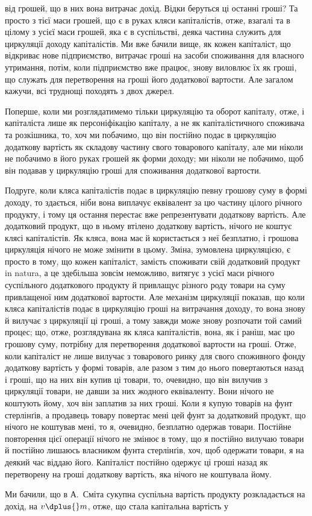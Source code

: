 \parcont{}  %
від грошей, що в них вона витрачає дохід. Відки беруться ці останні
гроші? Та просто з тієї маси грошей, що є в руках кляси капіталістів,
отже, взагалі та в цілому з усієї маси грошей, яка є в суспільстві,
деяка частина служить для циркуляції доходу капіталістів. Ми
вже бачили вище, як кожен капіталіст, що відкриває нове підприємство,
витрачає гроші на засоби споживання для власного утримання, потім,
коли підприємство вже працює, знову виловлює їх як гроші, що служать
для перетворення на гроші його додаткової вартости. Але загалом кажучи,
всі труднощі походять з двох джерел.

Поперше, коли ми розглядатимемо тільки циркуляцію та оборот капіталу,
отже, і капіталіста лише як персоніфікацію капіталу, а не як капіталістичного
споживача та розкішника, то, хоч ми побачимо, що він
постійно подає в циркуляцію додаткову вартість як складову частину
свого товарового капіталу, але ми ніколи не побачимо в його руках грошей
як форми доходу; ми ніколи не побачимо, щоб він подавав у циркуляцію
гроші для споживання додаткової вартости.

Подруге, коли кляса капіталістів подає в циркуляцію певну грошову
суму в формі доходу, то здається, ніби вона виплачує еквівалент за цю
частину цілого річного продукту, і тому ця остання перестає вже репрезентувати
додаткову вартість. Але додатковий продукт, що в ньому
втілено додаткову вартість, нічого не коштує клясі капіталістів. Як кляса,
вона має й користається з неї безплатно, і грошова циркуляція нічого
не може змінити в цьому. Зміна, зумовлена циркуляцією, є просто в тому,
що кожен капіталіст, замість споживати свій додатковий продукт in natura,
а це здебільша зовсім неможливо, витягує з усієї маси річного суспільного
додаткового продукту й привлащує різного роду товари на суму
привлащеної ним додаткової вартости. Але механізм циркуляції показав,
що коли кляса капіталістів подає в циркуляцію гроші на витрачання
доходу, то вона знову й вилучає з циркуляції ці гроші, а тому завжди
може знову розпочати той самий процес; що, отже, розглядувана як
кляса капіталістів, вона, як і раніш, має цю грошову суму, потрібну для
перетворення додаткової вартости на гроші. Отже, коли капіталіст не
лише вилучає з товарового ринку для свого споживного фонду додаткову
вартість у формі товарів, але разом з тим до нього повертаються назад
і гроші, що на них він купив ці товари, то, очевидно, що він вилучив
з циркуляції товари, не давши за них жодного еквіваленту. Вони нічого
не коштують йому, хоч він заплатив за них гроші. Коли я купую товарів
на фунт стерлінґів, а продавець товару повертає мені цей фунт за додатковий
продукт, що нічого не коштував мені, то я, очевидно, безплатно
одержав товари. Постійне повторення цієї операції нічого не змінює в
тому, що я постійно вилучаю товари й постійно лишаюсь власником
фунта стерлінґів, хоч, щоб одержати товари, я на деякий час віддаю
його. Капіталіст постійно одержує ці гроші назад як перетворену на
гроші додаткову вартість, яка нічого не коштувала йому.

Ми бачили, що в А.~Сміта сукупна суспільна вартість продукту розкладається
на дохід, на $v \dplus{} m$, отже, що стала капітальна вартість у
\parbreak{}  %
